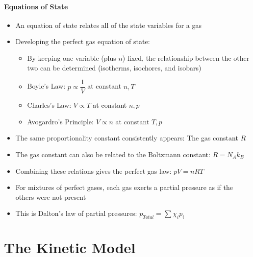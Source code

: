 \documentclass[12pt, openany, letterpaper]{memoir}
\begin{document}
\paragraph{Equations of State}
\begin{itemize}
	\item An equation of state relates all of the state variables for a gas
	\item Developing the perfect gas equation of state:
	      \begin{itemize}
		      \item By keeping one variable (plus $n$) fixed, the relationship between the other two can be determined (isotherms, isochores, and isobars)
		      \item Boyle's Law: $p\propto \dfrac{1}{V}$ at constant $n,T$
		      \item Charles's Law: $V\propto T$ at constant $n,p$
		      \item Avogardro's Principle: $V\propto n$ at constant $T,p$
	      \end{itemize}
	\item The same proportionality constant consistently appears: The gas constant $R$
	\item The gas constant can also be related to the Boltzmann constant: $R=N_A k_B$
	\item Combining these relations gives the perfect gas law: $pV=nRT$
	\item For mixtures of perfect gases, each gas exerts a partial pressure as if the others were not present
	\item This is Dalton's law of partial pressures: ${p_{Total} = \sum{\chi_ip_i}}$

\end{itemize}

\section{The Kinetic Model}
\end{document}
